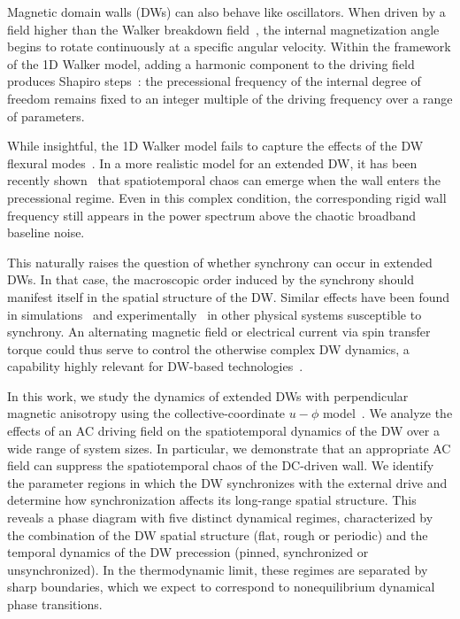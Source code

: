 \documentclass[prb,aps,twocolumn,superscriptaddress,floatfix]{revtex4-2}
\begin{document}
Magnetic domain walls (DWs) can also behave like oscillators. When driven by a field higher than the Walker breakdown field~\cite{Schryer1974}, the internal magnetization angle begins to rotate continuously at a specific angular velocity. Within the framework of the 1D Walker model, adding a harmonic component to the driving field produces Shapiro steps~\cite{shapiro1963josephson,berger1991prediction,kim2019}: the precessional frequency of the internal degree of freedom remains fixed to an integer multiple of the driving frequency over a range of parameters.

While insightful, the 1D Walker model fails to capture the effects of the DW flexural modes~\cite{thevenard2011domain,gourdon2013domain,Kim2024}. In a more realistic model for an extended DW, it has been recently shown~\cite{pusiol2026deterministic} that spatiotemporal chaos can emerge when the wall enters the precessional regime. Even in this complex condition, the corresponding rigid wall frequency still appears in the power spectrum above the chaotic broadband baseline noise.

This naturally raises the question of whether synchrony can occur in extended DWs. In that case, the macroscopic order induced by the synchrony should manifest itself in the spatial structure of the DW. Similar effects have been found in simulations~\cite{koltonmodelocking,koltonmodelocking2} and experimentally~\cite{okumasuppresion} in other physical systems susceptible to synchrony. An alternating magnetic field or electrical current via spin transfer torque could thus serve to control the otherwise complex DW dynamics, a capability highly relevant for DW-based technologies~\cite{Parkin2008,kim2019,Moon_2017,Munsu2021}.

In this work, we study the dynamics of extended DWs with perpendicular magnetic anisotropy using the collective-coordinate $u-\phi$ model~\cite{Slonczewski1972, Schryer1974}. We analyze the effects of an AC driving field on the spatiotemporal dynamics of the DW over a wide range of system sizes. In particular, we demonstrate that an appropriate AC field can suppress the spatiotemporal chaos of the DC-driven wall. We identify the parameter regions in which the DW synchronizes with the external drive and determine how synchronization affects its long-range spatial structure. This reveals a phase diagram with five distinct dynamical regimes, characterized by the combination of the DW spatial structure (flat, rough or periodic) and the temporal dynamics of the DW precession (pinned, synchronized or unsynchronized). In the thermodynamic limit, these regimes are separated by sharp boundaries, which we expect to correspond to nonequilibrium dynamical phase transitions.
\end{document}
